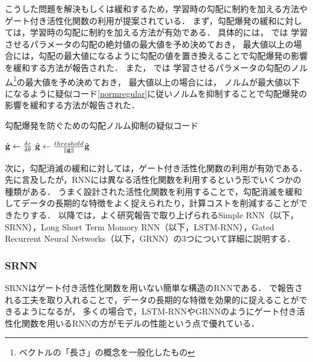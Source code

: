 こうした問題を解決もしくは緩和するため，学習時の勾配に制約を加える方法やゲート付き活性化関数の利用が提案されている．
まず，勾配爆発の緩和に対しては，学習時の勾配に制約を加える方法が有効である．
具体的には，
\cite{mikolov2012statistical}では
学習させるパラメータの勾配の絶対値の最大値を予め決めておき，
最大値以上の場合には，勾配の最大値になるように勾配の値を置き換えることで勾配爆発の影響を緩和する方法が報告された．
また，
\cite{pascanu2013difficulty}では
学習させるパラメータの勾配のノルム\footnote{ベクトルの「長さ」の概念を一般化したもの}の最大値を予め決めておき，
最大値以上の場合には， ノルムが最大値以下になるように疑似コード\ref{normregular}に従いノルムを抑制することで勾配爆発の影響を緩和する方法が報告された．
\begin{algorithm}                      
\caption{勾配爆発を防ぐための勾配ノルム抑制の疑似コード}
\label{normregular}                          
\begin{algorithmic}                  
	\STATE $\hat{{\bf g}} \leftarrow \frac{\delta \varepsilon}{\delta {\bf \theta}}$
	\STATE $\hat{{\bf g}} \leftarrow \frac{threshold}{\Vert \hat{{\bf g}} \Vert} \hat{{\bf g}}$
	\ENDIF
\end{algorithmic}
\end{algorithm}


次に，勾配消滅の緩和に対しては，ゲート付き活性化関数の利用が有効である．
先に言及したが，RNNには異なる活性化関数を利用するという形でいくつかの種類がある．
うまく設計された活性化関数を利用することで，勾配消滅を緩和してデータの長期的な特徴をよく捉えられたり，計算コストを削減することができたりする．
以降では，よく研究報告で取り上げられるSimple RNN（以下，SRNN）\cite{williams1989learning}，Long Short  Term Momory RNN（以下，LSTM-RNN）\cite{hochreiter1997long}，Gated Recurrent Neural Networks（以下，GRNN）\cite{cho2014learning}の3つについて詳細に説明する．



\subsubsection{SRNN}
SRNNはゲート付き活性化関数を用いない簡単な構造のRNNである．
\cite{le2015simple, krueger2015regularizing}で報告される工夫を取り入れることで，データの長期的な特徴を効果的に捉えることができるようになるが，
多くの場合で，LSTM-RNNやGRNNのようにゲート付き活性化関数を用いるRNNの方がモデルの性能という点で優れている．

